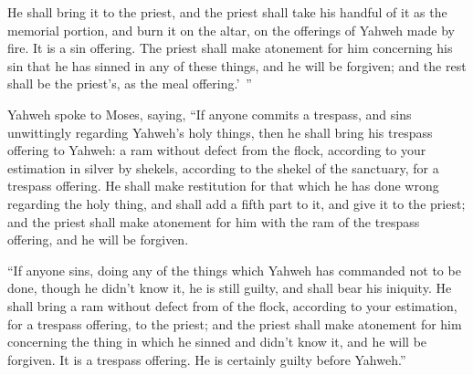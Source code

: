 {He shall bring it to the priest, and the priest shall take his handful of it as the memorial portion, and burn it on the altar, on the offerings of Yahweh made by fire. It is a sin offering.
The priest shall make atonement for him concerning his sin that he has sinned in any of these things, and he will be forgiven; and the rest shall be the priest’s, as the meal offering.’ ”
\par }{\PP {}Yahweh spoke to Moses, saying,
“If anyone commits a trespass, and sins unwittingly regarding Yahweh’s holy things, then he shall bring his trespass offering to Yahweh: a ram without defect from the flock, according to your estimation in silver by shekels, according to the shekel of the sanctuary, for a trespass offering.
He shall make restitution for that which he has done wrong regarding the holy thing, and shall add a fifth part to it, and give it to the priest; and the priest shall make atonement for him with the ram of the trespass offering, and he will be forgiven.
\par }{\PP {}“If anyone sins, doing any of the things which Yahweh has commanded not to be done, though he didn’t know it, he is still guilty, and shall bear his iniquity.
He shall bring a ram without defect from of the flock, according to your estimation, for a trespass offering, to the priest; and the priest shall make atonement for him concerning the thing in which he sinned and didn’t know it, and he will be forgiven.
It is a trespass offering. He is certainly guilty before Yahweh.”

}

